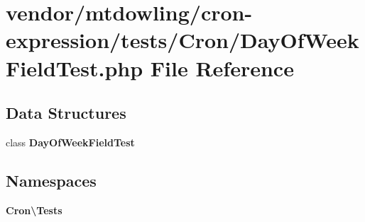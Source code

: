 \section{vendor/mtdowling/cron-\/expression/tests/\+Cron/\+Day\+Of\+Week\+Field\+Test.php File Reference}
\label{_day_of_week_field_test_8php}
\subsection*{Data Structures}
\begin{DoxyCompactItemize}
\item 
class {\bf Day\+Of\+Week\+Field\+Test}
\end{DoxyCompactItemize}
\subsection*{Namespaces}
\begin{DoxyCompactItemize}
\item 
 {\bf Cron\textbackslash{}\+Tests}
\end{DoxyCompactItemize}
